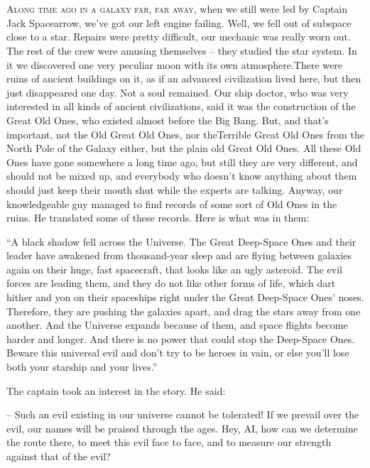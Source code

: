 \documentclass[ebook,twoside,final,openright]{memoir}
\begin{document}
\chapter{}
\par
\lettrine{A}{long time ago in a galaxy far, far away,} when we still were led by Captain Jack Spacearrow, we’ve got our left engine failing. Well, we fell out of subspace close to a star. Repairs were pretty difficult, our mechanic was really worn out. The rest of the crew were amusing themselves – they studied the star system. In it we discovered one very peculiar moon with its own atmosphere.There were ruins of ancient buildings on it, as if an advanced civilization lived here, but then just disappeared one day. Not a soul remained. Our ship doctor, who was very interested in all kinds of ancient civilizations, said it was the construction of the Great Old Ones, who existed almost before the Big Bang. But, and that’s important, not the Old Great Old Ones, nor theTerrible Great Old Ones from the North Pole of the Galaxy either, but the plain old Great Old Ones. All these Old Ones have gone somewhere a long time ago, but still they are very different, and should not be mixed up, and everybody who doesn’t know anything about them should just keep their mouth shut while the experts are talking. Anyway, our knowledgeable guy managed to find records of some sort of Old Ones in the ruins. He translated some of these records. Here is what was in them:\par
\par
“A black shadow fell across the Universe. The Great Deep-Space Ones and their leader have awakened from thousand-year sleep and are flying between galaxies again on their huge, fast spacecraft, that looks like an ugly asteroid. The evil forces are leading them, and they do not like other forms of life, which dart hither and yon on their spaceships right under the Great Deep-Space Ones’ noses. Therefore, they are pushing the galaxies apart, and drag the stars away from one another. And the Universe expands because of them, and space flights become harder and longer. And there is no power that could stop the Deep-Space Ones. Beware this universal evil and don’t try to be heroes in vain, or else you’ll lose both your starship and your lives.”\par
\par
The captain took an interest in the story. He said:\par
– Such an evil existing in our universe cannot be tolerated! If we prevail over the evil, our names will be praised through the ages. Hey, AI, how can we determine the route there, to meet this evil face to face, and to measure our strength against that of the evil?\par
\end{document}
